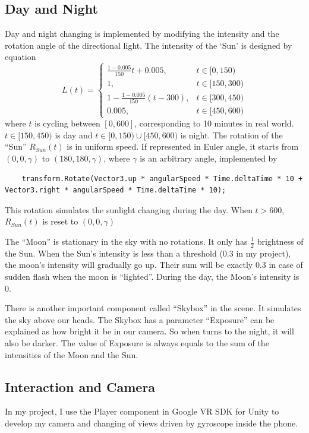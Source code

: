 \documentclass[11pt]{article}
\begin{document}
	\subsection{Day and Night}
	Day and night changing is implemented by modifying the intensity and the rotation angle of the directional light. The intensity of the `Sun' is designed by equation
	\begin{equation*}
		L(t) = 
		\left\{
			\begin{array}{lr}
				\frac{1-0.005}{150}t + 0.005, & t\in[0, 150)\\
				1, &t\in[150, 300)\\
				1 - \frac{1-0.005}{150}(t-300), & t\in[300, 450)\\
				0.005, & t\in[450, 600)
			\end{array}
		\right.
	\end{equation*}
	where $t$ is cycling between $[0, 600]$, corresponding to 10 minutes in real world. $t\in[150, 450)$ is day and $t\in[0, 150) \cup [450, 600)$ is night.
	The rotation of the ``Sun'' $R_{Sun}(t)$ is in uniform speed. If represented in Euler angle, it starts from $(0, 0, \gamma)$ to $(180, 180, \gamma)$, where $\gamma$ is an arbitrary angle, implemented by 
	\begin{lstlisting}
	transform.Rotate(Vector3.up * angularSpeed * Time.deltaTime * 10 + Vector3.right * angularSpeed * Time.deltaTime * 10);\end{lstlisting}
	This rotation simulates the sunlight changing during the day. 
	When $t>600$, $R_{Sun}(t)$ is reset to $(0, 0, \gamma)$
	
	The ``Moon'' is stationary in the sky with no rotations. It only has $\frac{1}{2}$ brightness of the Sun. When the Sun's intensity is less than a threshold ($0.3$ in my project), the moon's intensity will gradually go up. Their sum will be exactly $0.3$ in case of sudden flash when the moon is ``lighted''. During the day, the Moon's intensity is $0$.
	
	There is another important component called ``Skybox'' in the scene. It simulates the sky above our heads. The Skybox has a parameter ``Exposure'' can be explained as how bright it be in our camera. So when turns to the night, it will also be darker. The value of Exposure is always equals to the sum of the intensities of the Moon and the Sun.
	
	\subsection{Interaction and Camera}
	In my project, I use the Player component in Google VR SDK for Unity\cite{googlevrsdk} to develop my camera and changing of views driven by gyroscope inside the phone.
	
\end{document}
